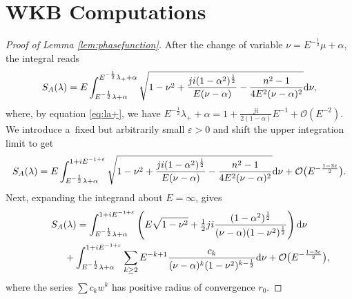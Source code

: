 \documentclass[pdftex]{sigma}
\numberwithin{equation}{section}
\newcommand{\e}{\varepsilon}
\newcommand{\la}{\lambda}
\newcommand{\al}{\alpha}
\begin{document}
\section{WKB Computations}\label{appendix:wkb}
\begin{proof}[Proof of Lemma \ref{lem:phasefunction}]
	After the change of variable $\nu=E^{-\frac12}\mu+\al$, the integral reads
	\begin{gather*}
	S_A(\la)= E \int^{E^{-\frac12}\la_+ +\al}_{E^{-\frac12}\la+\al}
	\sqrt{1-\nu^2+ \frac{ji (1-\al^2)^{\frac12}}{E(\nu-\al)}-\frac{n^2-1}{4 E^2(\nu-\al)^2}} {\rm d}\nu,
	\end{gather*}
where, by equation \eqref{eq:la+}, we have $E^{-\frac12}\la_+ +\al= 1+\frac{ji}{2(1-\al)}E^{-1}+\mathcal{O}(E^{-2})$. We introduce a~f\/ixed but arbitrarily small $\e>0$
	and shift the upper integration limit to get
	\begin{gather*}
	S_A(\la)=E \int^{1+ i E^{-1+\e}}_{E^{-\frac12}\la+\al}
	\sqrt{1-\nu^2+ \frac{ji (1-\al^2)^{\frac12}}{E(\nu-\al)}-\frac{n^2-1}{4 E^2(\nu-\al)^2}} {\rm d}\nu +\mathcal{O}\big(E^{-\frac{1-3\e}{2}}\big).
	\end{gather*}
	Next, expanding the integrand about $E=\infty$, gives{\samepage
	\begin{gather}\nonumber
	S_A(\la)= \int^{1+i E^{-1+\e}}_{E^{-\frac12}\la+\al} \left(E\sqrt{1-\nu^2}+ \tfrac{1}{2}ji
	\frac{ (1-\al^2)^{\frac12}}{(\nu-\al)(1-\nu^2)^{\frac12}} \right) {\rm d}\nu \\ \label{eq:phaseappendix}
\hphantom{S_A(\la)=}{} +\int^{1+i E^{-1+\e}}_{E^{-\frac12}\la+\al} \sum_{k\geq2} E^{-k+1} \frac{c_k}{(\nu-\al)^k(1-\nu^2)^{k-\frac12}} {\rm d}\nu +\mathcal{O}\big(E^{-\frac{1-3\e}{2}}\big),
	\end{gather}
	where the series $\sum c_k w^k$ has positive radius of convergence $r_0$.}


\end{proof}
\end{document}
